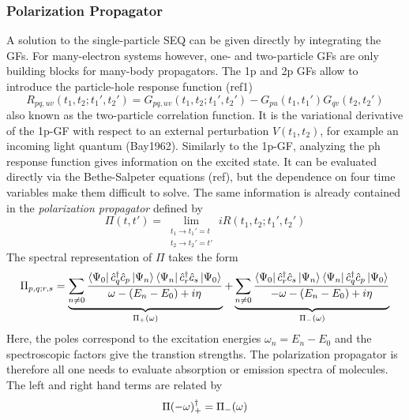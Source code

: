 \subsubsection{Polarization Propagator}

A solution to the single-particle SEQ can be given directly by integrating the GFs. For many-electron systems however, one- and two-particle GFs are only building blocks for many-body propagators. The 1p and 2p GFs allow to introduce the particle-hole response function (ref1) 
\begin{equation}
R_{pq,uv}(t_1,t_2;t_1',t_2') = G_{pq,uv}(t_1,t_2;t_1',t_2') - G_{pu}(t_1,t_1')G_{qv}(t_2,t_2')
\end{equation}
\noindent also known as the two-particle correlation function. It is the variational derivative of the 1p-GF with respect to an external perturbation $V(t_1,t_2)$, for example an incoming light quantum (Bay1962). Similarly to the 1p-GF, analyzing the ph response function gives information on the excited state. It can be evaluated directly via the Bethe-Salpeter equations (ref), but the dependence on four time variables make them difficult to solve. The same information is already contained in the \emph{polarization propagator} defined by
\begin{equation}
\Pi(t,t') = \lim_{\substack{t_1 \rightarrow t_1'=t \\
t_2 \rightarrow t_2' = t'}} iR(t_1,t_2;t_1',t_2')
\end{equation}  
\noindent The spectral representation of $\Pi$ takes the form
\begin{equation}
\Pi _{p,q;r,s} = \underbrace{ \sum_{n \neq 0} \frac{ 
	\bra{\Psi_0} \hat{c}_q ^{\dagger} \hat{c}_p 		\ket{\Psi_n} \bra{\Psi_n} \hat{c}_r ^{\dagger} \hat{c}_s \ket{\Psi_0}
}{
	\omega - (E_n - E_0) + i \eta
} }_\text{$\Pi _+(\omega)$} + \underbrace{ \sum_{n \neq 0} \frac{ 
	\bra{\Psi_0} \hat{c}_r ^{\dagger} \hat{c}_s \ket{\Psi_n} \bra{\Psi_n} \hat{c}_q ^{\dagger} \hat{c}_p \ket{\Psi_0}
}{
	- \omega - (E_n - E_0) + i \eta
} }_\text{$\Pi _-(\omega)$}
\label{eq:POLPROP}
\end{equation}
\noindent Here, the poles correspond to the excitation energies $\omega_n = E_n - E_0$ and the spectroscopic factors give the transtion strengths. The polarization propagator is therefore all one needs to evaluate absorption or emission spectra of molecules. The left and right hand terms are related by
\begin{equation}
\Pi(-\omega)_{+}^{\dagger} = \Pi_{-}(\omega)
\end{equation}

